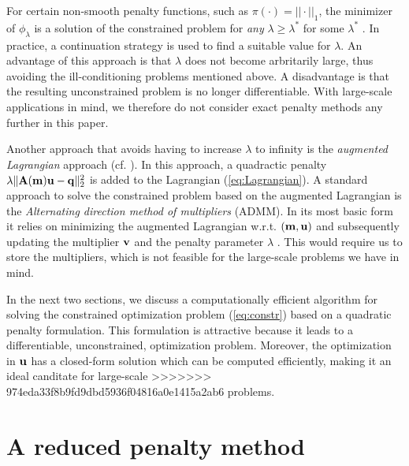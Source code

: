 \documentclass{iopart}
\begin{document}
{For certain non-smooth penalty functions, such as $\pi(\cdot) = ||\cdot||_1$, the minimizer of $\phi_{\lambda}$ is a solution of the constrained problem for \emph{any} $\lambda \geq \lambda^*$ for some $\lambda^*$ \cite[Thm. 17.3]{Nocedal}. In practice, a continuation strategy is used to find a suitable value for $\lambda$. An advantage of this approach is that $\lambda$ does not become arbritarily large, thus avoiding the ill-conditioning problems mentioned above. A disadvantage is that the resulting unconstrained problem is no longer differentiable. With large-scale applications in mind, we therefore do not consider exact penalty methods any further in this paper.

Another approach that avoids having to increase $\lambda$ to infinity is the \emph{augmented Lagrangian} approach (cf. \cite{Nocedal}). In this approach, a quadractic penalty $\lambda\|\mathbf{A}(\mathbf{m})\mathbf{u} - \mathbf{q}\|_2^2$ is added to the Lagrangian (\ref{eq:Lagrangian}). A standard approach to solve the constrained problem based on the augmented Lagrangian is the \emph{Alternating direction method of multipliers} (ADMM). In its most basic form it relies on minimizing the augmented Lagrangian w.r.t. $(\mathbf{m}, \mathbf{u})$ and subsequently updating the multiplier $\mathbf{v}$ and the penalty parameter $\lambda$ \cite{Eckstein2012a,Curtis2014}. This would require us to store the multipliers, which is not feasible for the large-scale problems we have in mind.

In the next two sections, we discuss a computationally efficient algorithm for solving the constrained optimization problem (\ref{eq:constr}) based on a quadratic penalty formulation. This formulation is attractive because it leads to a differentiable, unconstrained, optimization problem. Moreover, the optimization in $\mathbf{u}$ has a closed-form solution which can be computed efficiently, making it an ideal canditate for large-scale
>>>>>>> 974eda33f8b9fd9dbd5936f04816a0e1415a2ab6
problems.

\section{A reduced penalty method}
\label{varpro}

}
\end{document}
